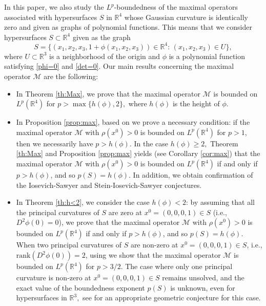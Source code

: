 \documentclass[a4paper, 11pt]{article}
\theoremstyle{plain}
\theoremstyle{definition}
\theoremstyle{lemma}
\theoremstyle{Remark}
\theoremstyle{proposition}
\theoremstyle{corollary}
\theoremstyle{example}
\theoremstyle{assumption}
\begin{document}
 In this paper, we also study the $L^p$-boundedness of the maximal operators associated with hypersurfaces $S$ in $\mathbb{R}^4$ whose Gaussian curvature is identically zero and  given as graphs of  polynomial functions.
This means that we consider hypersurfaces $S\subset \mathbb{R}^4$  given as the
graph
\begin{equation*}
S=\{(x_1,x_2,x_3, 1+\phi(x_1,x_2,x_3))\in \mathbb{R}^{4}:\,(x_1,x_2,x_3)\in U\},
\end{equation*}
 where $U\subset \mathbb{R}^3$ is a neighborhood of the origin and $\phi$ is a  polynomial function satisfying \eqref{phi=0} and \eqref{det=0}.
 Our main results concerning the maximal operator $\mathcal{M}$ are the following:
 \begin{itemize}
 \item In Theorem \ref{th:Max}, we prove that the maximal operator $\mathcal{M}$ is bounded on $L^p(\mathbb{R}^4)$ for $p>\max\{h(\phi), 2\},$ where $h(\phi)$ is the height of $\phi.$
 \item In Proposition \ref{prop:max}, based on \cite{Io.Saw} we prove a necessary condition: if the maximal operator $\mathcal{M}$ with  $\rho(x^0)>0$ is bounded on $L^p(\mathbb{R}^4)$ for $p>1$, then we necessarily have $p>h(\phi)$. In the case $h(\phi)\geq 2,$  Theorem \ref{th:Max} and  Proposition \ref{prop:max} yields (see Corollary \ref{cor:max}) that the maximal operator $\mathcal{M}$ with $\rho(x^0)>0$ is bounded on $L^p(\mathbb{R}^4)$ if and only if $p>h(\phi)$, and so $p(S)=h(\phi).$
 In addition, we obtain confirmation of the Iosevich-Sawyer  and  Stein-Iosevich-Sawyer conjectures.

 \item In Theorem \ref{th:h<2}, we consider the case  $h(\phi)<2$:  by assuming  that all the  principal curvatures of $S$  are zero at $x^0=(0,0,0,1)\in S$ (i.e., $D^2\phi(0)=0$), we  prove that the maximal operator $\mathcal{M}$ with $\rho(x^0)>0$ is bounded on $L^p(\mathbb{R}^4)$ if and only if $p>h(\phi)$, and so $p(S)=h(\phi)$. When two principal curvatures of $S$  are non-zero at $x^0=(0,0,0,1)\in S$,  i.e., $\mathrm{rank}(D^2\phi(0))=2$, using \cite{Gr} we show that  the maximal operator $\mathcal{M}$ is bounded on $L^p(\mathbb{R}^4)$ for $p>3/2.$ The case where only one principal curvature is non-zero at $x^0=(0,0,0,1)\in S$ remains unsolved, and the exact value of the boundedness exponent $p(S)$ is unknown, even for hypersurfaces in $\mathbb{R}^3,$ see \cite{P2} for an appropriate geometric conjecture 
 for this case. 
\end{itemize}
\end{document}

